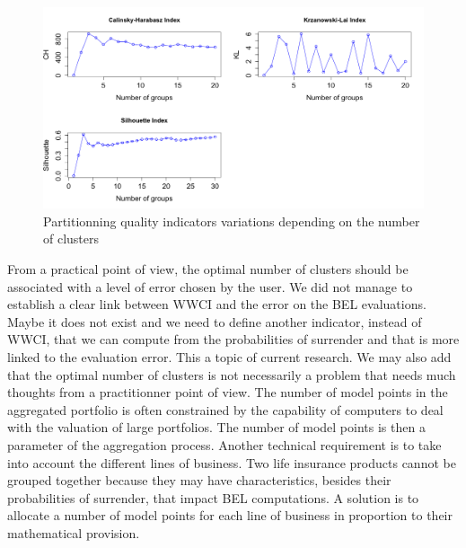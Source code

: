 \begin{center}
	\begin{figure}[ht!]
		\begin{center}
			\includegraphics[width=15cm]{Chapitre6/PartintioningIndex.png}
			\caption{Partitionning quality indicators variations depending on the number of clusters}
			\label{PartitionIndex}
		\end{center}
	\end{figure}
\end{center}
From a practical point of view, the optimal number of clusters should be associated with a level of error chosen by the user. We did not manage to establish a clear link between WWCI and the error on the BEL evaluations. Maybe it does not exist and we need to define another indicator, instead of WWCI, that we can compute from the probabilities of surrender and that is more linked to the evaluation error. This a topic of current research. We may also add that the optimal number of clusters is not necessarily a problem that needs much thoughts from a practitionner point of view. The number of model points in the aggregated portfolio is often constrained by the capability of computers to deal with the valuation of large portfolios. The number of model points is then a parameter of the aggregation process. Another technical requirement is to take into account the different lines of business. Two life insurance products cannot be grouped together because they may have characteristics, besides their probabilities of surrender, that impact BEL computations. A solution is to allocate a number of model points for each line of business in proportion to their mathematical provision.  

